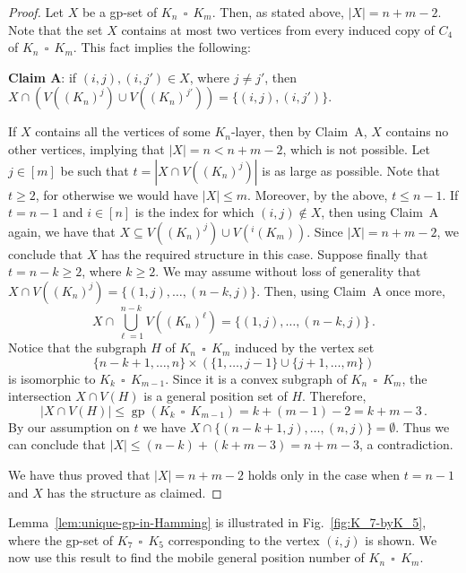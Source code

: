 \documentclass[a4paper,12pt]{article}
\DeclareMathOperator{\gp}{gp}
\DeclareMathOperator{\cp}{\,\square\,}
\theoremstyle{definition}
\begin{document}
	\begin{proof}
		Let $X$ be a gp-set of $K_n\cp K_m$. Then, as stated above, $|X| = n + m - 2$. Note that the set $X$ contains at most two vertices from every induced copy of $C_4$ of $K_n\cp K_m$. This fact implies the following: 
		
		\medskip\noindent
		{\bf Claim A}: if $(i,j), (i,j')\in X$, where $j\ne j'$, then 
		$X \cap \left( V((K_n)^j) \cup V((K_n)^{j'})  \right) = \{(i,j), (i,j')\}$. 
		
		\medskip
		If $X$ contains all the vertices of some $K_n$-layer, then by Claim~A, $X$ contains no other vertices, implying that $|X| = n < n + m - 2$, which is not possible. Let $j\in [m]$ be such that $t = |X \cap V((K_n)^{j})|$ is as large as possible. Note that $t\ge 2$, for otherwise we would have $|X|\le m$. Moreover, by the above, $t \le n-1$. If $t = n-1$ and $i\in [n]$ is the index for which $(i,j)\notin X$, then using Claim~A again, we have that $X \subseteq V((K_n)^j) \cup V(^i(K_m))$. Since $|X| = n+m-2$, we conclude that $X$ has the required structure in this case. Suppose finally that $t=n-k\ge 2$, where $k\ge 2$. We may assume without loss of generality that $X \cap V((K_n)^j ) = \{(1,j), \ldots, (n-k,j)\}$. Then, using Claim~A once more, 
		$$X \cap \bigcup_{\ell = 1}^{n-k} V((K_n)^{\ell}) = \{(1,j), \ldots, (n-k,j)\}\,.$$
		Notice that the subgraph $H$ of $K_n\cp K_m$ induced by the vertex set 
		$$\{n-k+1, \ldots, n\} \times \left( \{1, \ldots, j-1\} \cup \{j+1, \ldots, m \} \right)$$
		is isomorphic to $K_{k} \cp K_{m-1}$. Since it is a convex subgraph of $K_n\cp K_m$, the intersection $X\cap V(H)$ is a general position set of $H$. Therefore, 
		$$|X \cap V(H)| \le \gp(K_{k} \cp K_{m-1}) = k + (m-1) - 2 = k + m - 3\,.$$ 
		By our assumption on $t$ we have $X\cap \{(n-k+1,j), \ldots, (n,j)\} = \emptyset$. Thus we can conclude that $|X| \le (n - k) + (k + m - 3) = n + m -3$, a contradiction. 
		
		We have thus proved that $|X| = n + m - 2$ holds only in the case when $t = n-1$ and $X$ has the structure as claimed. 
	\end{proof}
	
	Lemma~\ref{lem:unique-gp-in-Hamming} is illustrated in Fig.~\ref{fig:K_7-byK_5}, where the gp-set of $K_7\cp K_5$ corresponding to the vertex $(i,j)$ is shown. We now use this result to find the mobile general position number of $K_n \cp K_m$.
	
\end{document}

